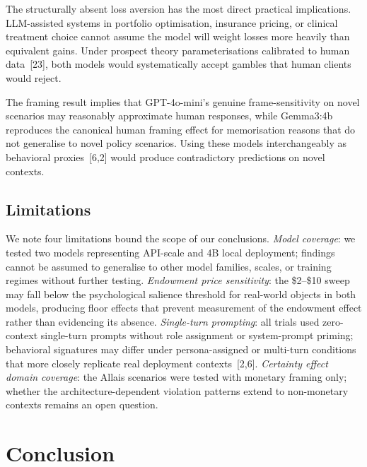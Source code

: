 \documentclass{article}
\begin{document}
The structurally absent loss aversion has the most direct practical
implications. LLM-assisted systems in portfolio optimisation, insurance
pricing, or clinical treatment choice cannot assume the model will
weight losses more heavily than equivalent gains. Under prospect theory
parameterisations calibrated to human data~[23], both models would
systematically accept gambles that human clients would reject.

The framing result implies that GPT-4o-mini's genuine frame-sensitivity
on novel scenarios may reasonably approximate human responses, while
Gemma3:4b reproduces the canonical human framing effect for memorisation
reasons that do not generalise to novel policy scenarios. Using these
models interchangeably as behavioral proxies~[6,2] would produce
contradictory predictions on novel contexts.

\subsection{Limitations}

We note four limitations bound the scope of our conclusions.
\emph{Model coverage}: we tested two models representing API-scale and
4B local deployment; findings cannot be assumed to generalise to other
model families, scales, or training regimes without further testing.
\emph{Endowment price sensitivity}: the \$2--\$10 sweep may fall below
the psychological salience threshold for real-world objects in both models,
producing floor effects that prevent measurement of the endowment effect
rather than evidencing its absence.
\emph{Single-turn prompting}: all trials used zero-context single-turn
prompts without role assignment or system-prompt priming; behavioral
signatures may differ under persona-assigned or multi-turn conditions
that more closely replicate real deployment contexts~[2,6].
\emph{Certainty effect domain coverage}: the Allais scenarios were tested
with monetary framing only; whether the architecture-dependent violation
patterns extend to non-monetary contexts remains an open question.

\section{Conclusion}
\end{document}
